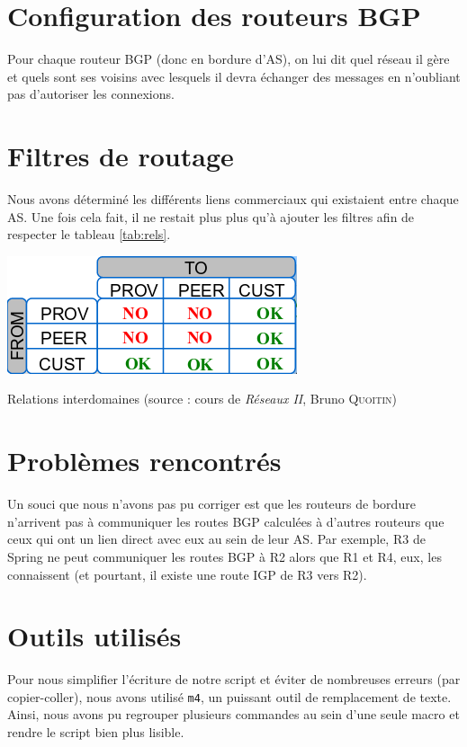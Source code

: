 \documentclass[10pt,a4paper,twocolumn]{article}
\begin{document}
\section{Configuration des routeurs BGP}
Pour chaque routeur BGP (donc en bordure d'AS), on lui dit quel réseau il gère et quels sont ses voisins avec lesquels il devra échanger des messages en n'oubliant pas d'autoriser les connexions.

\section{Filtres de routage}
Nous avons déterminé les différents liens commerciaux qui existaient entre chaque AS. Une fois cela fait, il ne restait plus plus qu'à ajouter les filtres afin de respecter le tableau \ref{tab:rels}.
\begin{table}[h]
	\includegraphics[width=\columnwidth]{comlink.png}
	\caption{Relations interdomaines (source : cours de \textit{Réseaux II}, Bruno \textsc{Quoitin})}
	\label{tab:rels}
\end{table}

\section{Problèmes rencontrés}
Un souci que nous n'avons pas pu corriger est que les routeurs de bordure n'arrivent pas à communiquer les routes BGP calculées à d'autres routeurs que ceux qui ont un lien direct avec eux au sein de leur AS.
Par exemple, R3 de Spring ne peut communiquer les routes BGP à R2 alors que R1 et R4, eux, les connaissent (et pourtant, il existe une route IGP de R3 vers R2).

\section{Outils utilisés}
Pour nous simplifier l'écriture de notre script et éviter de nombreuses erreurs (par copier-coller), nous avons utilisé \texttt{m4}, un puissant outil de remplacement de texte.
Ainsi, nous avons pu regrouper plusieurs commandes au sein d'une seule macro et rendre le script bien plus lisible.
\end{document}
